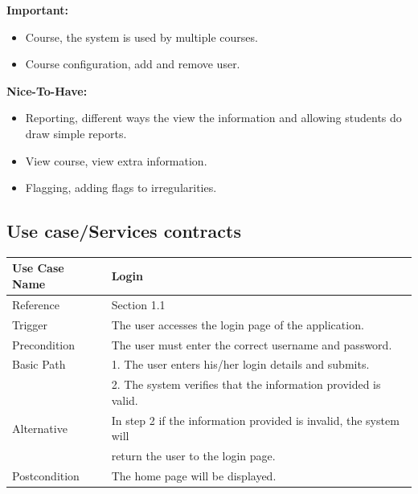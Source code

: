 \documentclass[10pt,a4paper]{article}
\begin{document}
 
 
\textbf{Important:}
\begin{itemize}
	\item Course, the system is used by multiple courses.

	\item Course configuration, add and remove user.
 \end{itemize}

\textbf{Nice-To-Have:}
 \begin{itemize}
	\item Reporting, different ways the view the information and allowing students do draw simple reports.

	\item View course, view extra information.

	\item Flagging, adding flags to irregularities.
 \end{itemize}


\subsection{Use case/Services contracts}
 \begin{tabular}{|l|l|}\hline
                        Use Case Name   & Login \\\hline
                        Reference & Section 1.1\\\hline
                        Trigger & The user accesses the login page of the application.\\\hline
                        Precondition & The user must enter the correct username and password.\\\hline
                        Basic Path & 1.	The user enters his/her login details and submits. 
                        \\\linebreak &
                        2.	 The system verifies that the information provided is valid.
                        \\\hline
                        Alternative & In step 2 if the information provided is invalid, the system will
                        \\\linebreak & return the user to the login page.\\\hline
                        Postcondition & The home page will be displayed.\\\hline
                \end{tabular} 
                
\end{document}
